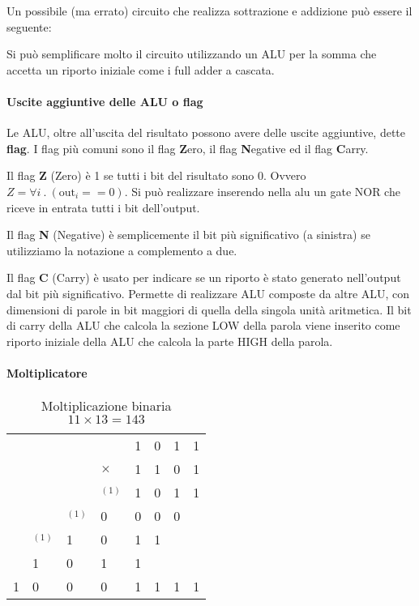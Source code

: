 Un possibile (ma errato) circuito che realizza sottrazione e addizione può essere il seguente:


Si può semplificare molto il circuito utilizzando un ALU per la somma che accetta un riporto iniziale come i full adder a cascata.


\paragraph{Uscite aggiuntive delle ALU o flag}

Le ALU, oltre all'uscita del risultato possono avere delle uscite aggiuntive, dette \textbf{flag}. I flag più comuni sono il flag \textbf{Z}ero, il flag \textbf{N}egative ed il flag \textbf{C}arry.

Il flag \textbf{Z} (Zero) è 1 se tutti i bit del risultato sono 0. Ovvero $ Z = \forall i \>.\> (\text{out}_i == 0) $. Si può realizzare inserendo nella alu un gate NOR che riceve in entrata tutti i bit dell'output.

Il flag \textbf{N} (Negative) è semplicemente il bit più significativo (a sinistra) se utilizziamo la notazione a complemento a due.

Il flag \textbf{C} (Carry) è usato per indicare se un riporto è stato generato nell'output dal bit più significativo. Permette di realizzare ALU composte da altre ALU, con dimensioni di parole in bit maggiori di quella della singola unità aritmetica. Il bit di carry della ALU che calcola la sezione LOW della parola viene inserito come riporto iniziale della ALU che calcola la parte HIGH della parola.


\paragraph{Moltiplicatore}

\begin{table}[H]
	\begin{tabular}{llllllll}
		&          &          &          & 1 & 0 & 1 & 1 \\
		&          &          & $\times$ & 1 & 1 & 0 & 1 \\ \cline{5-8} 
		&          &          & $^{(1)}$ & 1 & 0 & 1 & 1 \\
		&          & $^{(1)}$ & 0        & 0 & 0 & 0 &   \\
		& $^{(1)}$ & 1        & 0        & 1 & 1 &   &   \\
		& 1        & 0        & 1        & 1 &   &   &   \\ \cline{2-8} 
		1 & 0        & 0        & 0        & 1 & 1 & 1 & 1
	\end{tabular}
	\caption{Moltiplicazione binaria $11 \times 13 = 143$}
	\label{tab:binmult}
\end{table}


